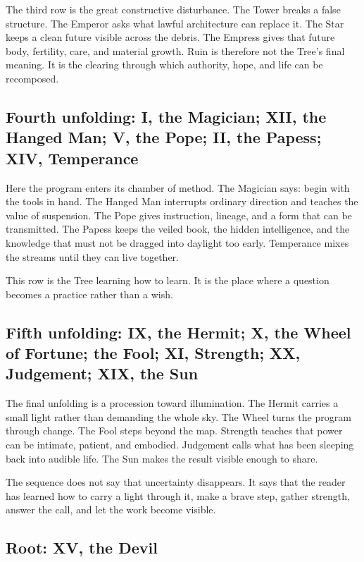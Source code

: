 The third row is the great constructive disturbance. The Tower breaks a false
structure. The Emperor asks what lawful architecture can replace it. The Star
keeps a clean future visible across the debris. The Empress gives that future
body, fertility, care, and material growth. Ruin is therefore not the Tree's
final meaning. It is the clearing through which authority, hope, and life can
be recomposed.

\subsection{Fourth unfolding: I, the Magician; XII, the Hanged Man; V, the Pope;
II, the Papess; XIV, Temperance}

Here the program enters its chamber of method. The Magician says: begin with
the tools in hand. The Hanged Man interrupts ordinary direction and teaches the
value of suspension. The Pope gives instruction, lineage, and a form that can
be transmitted. The Papess keeps the veiled book, the hidden intelligence, and
the knowledge that must not be dragged into daylight too early. Temperance
mixes the streams until they can live together.

This row is the Tree learning how to learn. It is the place where a question
becomes a practice rather than a wish.

\subsection{Fifth unfolding: IX, the Hermit; X, the Wheel of Fortune; the Fool;
XI, Strength; XX, Judgement; XIX, the Sun}

The final unfolding is a procession toward illumination. The Hermit carries a
small light rather than demanding the whole sky. The Wheel turns the program
through change. The Fool steps beyond the map. Strength teaches that power can
be intimate, patient, and embodied. Judgement calls what has been sleeping back
into audible life. The Sun makes the result visible enough to share.

The sequence does not say that uncertainty disappears. It says that the reader
has learned how to carry a light through it, make a brave step, gather strength,
answer the call, and let the work become visible.

\subsection{Root: XV, the Devil}

